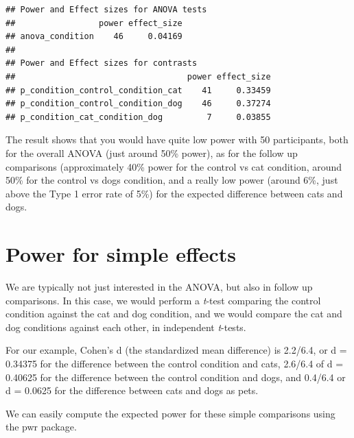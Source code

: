 \documentclass[]{book}
\newenvironment{Shaded}{\begin{snugshade}}{\end{snugshade}}
\newcommand{\CommentTok}[1]{\textcolor[rgb]{0.56,0.35,0.01}{\textit{#1}}}
\newcommand{\DataTypeTok}[1]{\textcolor[rgb]{0.13,0.29,0.53}{#1}}
\newcommand{\DecValTok}[1]{\textcolor[rgb]{0.00,0.00,0.81}{#1}}
\newcommand{\FloatTok}[1]{\textcolor[rgb]{0.00,0.00,0.81}{#1}}
\newcommand{\KeywordTok}[1]{\textcolor[rgb]{0.13,0.29,0.53}{\textbf{#1}}}
\newcommand{\NormalTok}[1]{#1}
\newcommand{\OperatorTok}[1]{\textcolor[rgb]{0.81,0.36,0.00}{\textbf{#1}}}
\newcommand{\StringTok}[1]{\textcolor[rgb]{0.31,0.60,0.02}{#1}}
\begin{document}
\begin{verbatim}
## Power and Effect sizes for ANOVA tests
##                 power effect_size
## anova_condition    46     0.04169
## 
## Power and Effect sizes for contrasts
##                                   power effect_size
## p_condition_control_condition_cat    41     0.33459
## p_condition_control_condition_dog    46     0.37274
## p_condition_cat_condition_dog         7     0.03855
\end{verbatim}

\begin{Shaded}
\end{Shaded}

The result shows that you would have quite low power with 50 participants, both for the overall ANOVA (just around 50\% power), as for the follow up comparisons (approximately 40\% power for the control vs cat condition, around 50\% for the control vs dogs condition, and a really low power (around 6\%, just above the Type 1 error rate of 5\%) for the expected difference between cats and dogs.

\hypertarget{power-for-simple-effects}{%
\section{Power for simple effects}\label{power-for-simple-effects}}

We are typically not just interested in the ANOVA, but also in follow up comparisons. In this case, we would perform a \emph{t}-test comparing the control condition against the cat and dog condition, and we would compare the cat and dog conditions against each other, in independent \emph{t}-tests.

For our example, Cohen's d (the standardized mean difference) is 2.2/6.4, or d = 0.34375 for the difference between the control condition and cats, 2.6/6.4 of d = 0.40625 for the difference between the control condition and dogs, and 0.4/6.4 or d = 0.0625 for the difference between cats and dogs as pets.

We can easily compute the expected power for these simple comparisons using the pwr package.

\begin{Shaded}
\end{Shaded}
\end{document}
